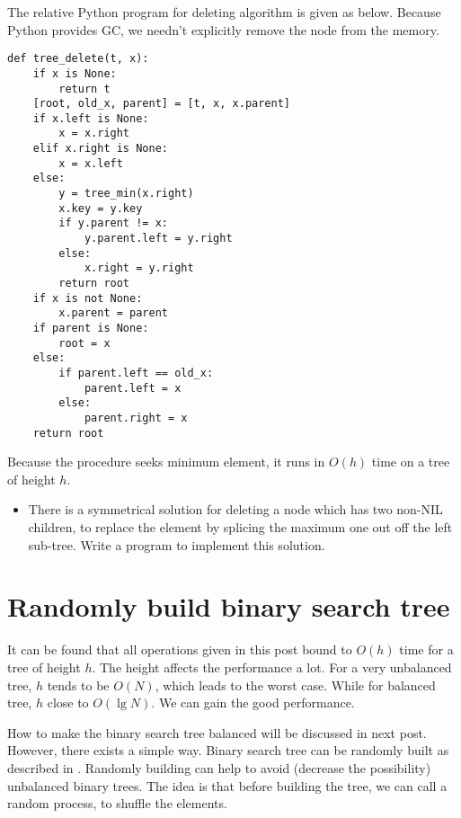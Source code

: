 \documentclass{article}
\begin{document}
The relative Python program for deleting algorithm is given as below.
Because Python provides GC, we needn't explicitly remove the node
from the memory.

\lstset{language=Python}
\begin{lstlisting}
def tree_delete(t, x):
    if x is None:
        return t
    [root, old_x, parent] = [t, x, x.parent]
    if x.left is None:
        x = x.right
    elif x.right is None:
        x = x.left
    else:
        y = tree_min(x.right)
        x.key = y.key
        if y.parent != x:
            y.parent.left = y.right
        else:
            x.right = y.right
        return root
    if x is not None:
        x.parent = parent
    if parent is None:
        root = x
    else:
        if parent.left == old_x:
            parent.left = x
        else:
            parent.right = x
    return root
\end{lstlisting}

Because the procedure seeks minimum element, it runs in $O(h)$ time on
a tree of height $h$.

\begin{Exercise}

\begin{itemize}
\item There is a symmetrical solution for deleting a node which has two
non-NIL children, to replace the element by splicing the maximum one out
off the left sub-tree. Write a program to implement this solution.
\end{itemize}

\end{Exercise}

\section{Randomly build binary search tree}
It can be found that all operations given in this post bound to $O(h)$
time for a tree of height $h$. The height affects the performance
a lot. For a very unbalanced tree, $h$ tends to be $O(N)$, which leads
to the worst case. While for balanced tree, $h$ close to $O(\lg N)$.
We can gain the good performance.

How to make the binary search tree
balanced will be discussed in next post. However, there exists a simple
way. Binary search tree can be randomly built as described in \cite{CLRS}.
Randomly building can help to avoid (decrease the possibility) unbalanced
binary trees. The idea is that before building the tree, we can call a random
process, to shuffle the elements.
\end{document}

